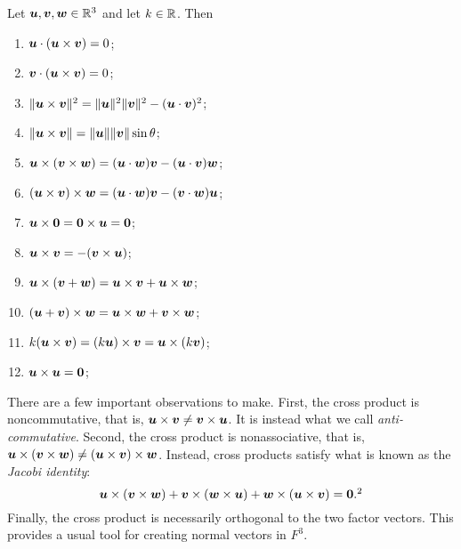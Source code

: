 \begin{Thm}\label{thm:cross} Let $\boldsymbol u, \boldsymbol v, \boldsymbol w\in \mathbb{R}^3$ and let $k\in \mathbb{R}$. Then \vspace{-0.15 in}
\begin{multicols}{2}
\begin{enumerate}[!THM!, start=1]
\item\label{item:crossortho} $\boldsymbol u \cdot (\boldsymbol u \times \boldsymbol v) = 0$;
\item $\boldsymbol v \cdot (\boldsymbol u \times \boldsymbol v) = 0$;
\item $\Vert \boldsymbol u \times \boldsymbol v\Vert^2 = \Vert \boldsymbol u \Vert^2\Vert \boldsymbol v\Vert^2 - (\boldsymbol u \cdot \boldsymbol v)^2$;
\item $\Vert \boldsymbol u \times \boldsymbol v\Vert = \Vert\boldsymbol u\Vert \Vert \boldsymbol v\Vert\sin\theta$;
\item $\boldsymbol u \times (\boldsymbol v \times \boldsymbol w) = (\boldsymbol u\cdot \boldsymbol w)\boldsymbol v - (\boldsymbol u \cdot \boldsymbol v)\boldsymbol w$;
\item $(\boldsymbol u \times \boldsymbol v)\times \boldsymbol w = (\boldsymbol u\cdot \boldsymbol w)\boldsymbol v - (\boldsymbol v\cdot \boldsymbol w)\boldsymbol u$;
\item $\boldsymbol u \times \boldsymbol 0 = \boldsymbol 0 \times \boldsymbol u = \boldsymbol 0$;
\item\label{item:crossskew} $\boldsymbol u \times \boldsymbol v = -(\boldsymbol v \times \boldsymbol u)$;
\item\label{item:crossdist} $\boldsymbol u \times (\boldsymbol v + \boldsymbol w) = \boldsymbol u \times \boldsymbol v + \boldsymbol u \times \boldsymbol w$;
\item $(\boldsymbol u + \boldsymbol v) \times \boldsymbol w = \boldsymbol u \times \boldsymbol w + \boldsymbol v \times \boldsymbol w$;
\item $k(\boldsymbol u \times \boldsymbol v) = (k\boldsymbol u) \times \boldsymbol v = \boldsymbol u \times (k\boldsymbol v)$;

\item\label{item:crosszero} $\boldsymbol u \times \boldsymbol u = \boldsymbol 0$;
\end{enumerate}
\end{multicols}
\end{Thm}

There are a few important observations to make. First, the cross product is noncommutative, that is, $\boldsymbol u \times \boldsymbol v \neq \boldsymbol v\times \boldsymbol u$. It is instead what we call \emph{anti-commutative}. Second, the cross product is nonassociative, that is, $\boldsymbol u \times (\boldsymbol v \times \boldsymbol w) \neq (\boldsymbol u \times \boldsymbol v)\times \boldsymbol w$. Instead, cross products satisfy what is known as the \emph{Jacobi identity}: 
\[\bb u \times (\bb v \times \bb w) + \bb v \times (\bb w \times \bb u) + \bb w\times (\bb u \times \bb v) = \bb 0.\footnotemark[2]\]
Finally, the cross product is necessarily orthogonal to the two factor vectors. This provides a usual tool for creating normal vectors in $F^3$.\\

